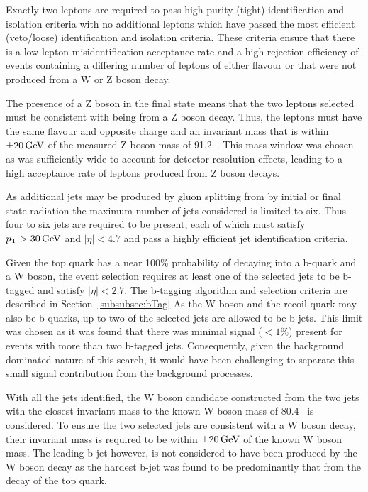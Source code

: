 Exactly two leptons are required to pass high purity (tight) identification and isolation criteria with no additional leptons which have passed the most efficient (veto/loose) identification and isolation criteria.
These criteria ensure that there is a low lepton misidentification acceptance rate and a high rejection efficiency of events containing a differing number of leptons of either flavour or that were not produced from a W or Z boson decay.

The presence of a Z boson in the final state means that the two leptons selected must be consistent with being from a Z boson decay.
Thus, the leptons must have the same flavour and opposite charge and an invariant mass that is within $\pm 20\,\text{Ge\hspace{-.08em}V}$ of the measured Z boson mass of 91.2\GeV~\cite{Tanabashi:2018oca}.
This mass window was chosen as was sufficiently wide to account for detector resolution effects, leading to a high acceptance rate of leptons produced from Z boson decays.

As additional jets may be produced by gluon splitting from by initial or final state radiation the maximum number of jets considered is limited to six.
Thus four to six jets are required to be present, each of which must satisfy $p_{\mathrm{T}} > 30\,\text{Ge\hspace{-.08em}V}$ and $|\eta| < 4.7$ and pass a highly efficient jet identification criteria.

Given the top quark has a near 100\% probability of decaying into a b-quark and a W boson, the event selection requires at least one of the selected jets to be b-tagged and satisfy $|\eta| < 2.7$.
The b-tagging algorithm and selection criteria are described in Section~\ref{subsubsec:bTag}
As the W boson and the recoil quark may also be b-quarks, up to two of the selected jets are allowed to be b-jets.
This limit was chosen as it was found that there was minimal signal ($< 1\%$) present for events with more than two b-tagged jets.
Consequently, given the background dominated nature of this search, it would have been challenging to separate this small signal contribution from the background processes.  

With all the jets identified, the W boson candidate constructed from the two jets with the closest invariant mass to the known W boson mass of 80.4\GeVcc~\cite{Tanabashi:2018oca} is considered.
To ensure the two selected jets are consistent with a W boson decay, their invariant mass is required to be within $\pm 20\,\text{Ge\hspace{-.08em}V}$ of the known W boson mass.
The leading b-jet however, is not considered to have been produced by the W boson decay as the hardest b-jet was found to be predominantly that from the decay of the top quark.

